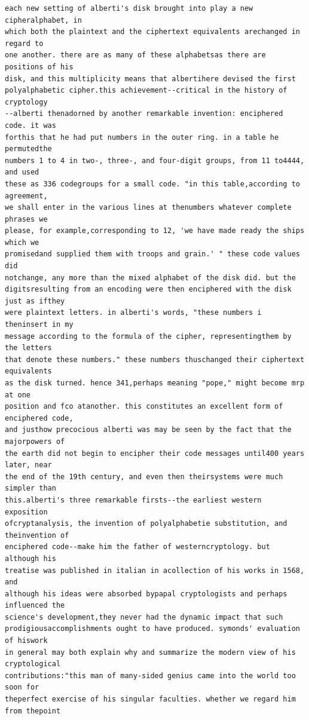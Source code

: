 \documentclass[12pt,a4paper]{article}
\begin{document}
\begin{lstlisting}[caption={Complete text after iteration 12}, label={lst:iter12}]
each new setting of alberti's disk brought into play a new cipheralphabet, in
which both the plaintext and the ciphertext equivalents arechanged in regard to
one another. there are as many of these alphabetsas there are positions of his
disk, and this multiplicity means that albertihere devised the first
polyalphabetic cipher.this achievement--critical in the history of cryptology
--alberti thenadorned by another remarkable invention: enciphered code. it was
forthis that he had put numbers in the outer ring. in a table he permutedthe
numbers 1 to 4 in two-, three-, and four-digit groups, from 11 to4444, and used
these as 336 codegroups for a small code. "in this table,according to agreement,
we shall enter in the various lines at thenumbers whatever complete phrases we
please, for example,corresponding to 12, 'we have made ready the ships which we
promisedand supplied them with troops and grain.' " these code values did
notchange, any more than the mixed alphabet of the disk did. but the
digitsresulting from an encoding were then enciphered with the disk just as ifthey
were plaintext letters. in alberti's words, "these numbers i theninsert in my
message according to the formula of the cipher, representingthem by the letters
that denote these numbers." these numbers thuschanged their ciphertext equivalents
as the disk turned. hence 341,perhaps meaning "pope," might become mrp at one
position and fco atanother. this constitutes an excellent form of enciphered code,
and justhow precocious alberti was may be seen by the fact that the majorpowers of
the earth did not begin to encipher their code messages until400 years later, near
the end of the 19th century, and even then theirsystems were much simpler than
this.alberti's three remarkable firsts--the earliest western exposition
ofcryptanalysis, the invention of polyalphabetie substitution, and theinvention of
enciphered code--make him the father of westerncryptology. but although his
treatise was published in italian in acollection of his works in 1568, and
although his ideas were absorbed bypapal cryptologists and perhaps influenced the
science's development,they never had the dynamic impact that such
prodigiousaccomplishments ought to have produced. symonds' evaluation of hiswork
in general may both explain why and summarize the modern view of his cryptological
contributions:"this man of many-sided genius came into the world too soon for
theperfect exercise of his singular faculties. whether we regard him from thepoint

\end{lstlisting}
\end{document}
